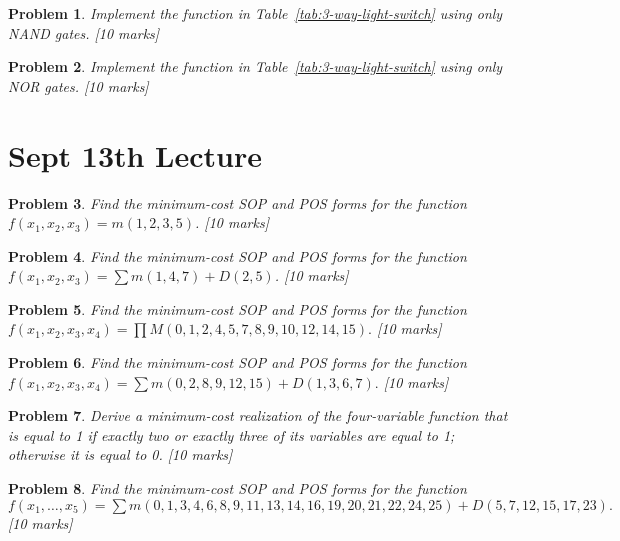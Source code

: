 \documentclass[twocolumn]{article}
\newtheorem{prob}{Problem}
\begin{document}
\begin{prob}
 Implement the function in Table~\ref{tab:3-way-light-switch} using only NAND
 gates. [10 marks]
\end{prob}

\begin{prob}
 Implement the function in Table~\ref{tab:3-way-light-switch} using only NOR
 gates. [10 marks]
\end{prob}

\section{Sept 13th Lecture}

\begin{prob}
Find the minimum-cost SOP and POS forms for the function $f(x_1 , x_2 , x_3 ) =
m(1, 2, 3, 5)$. \cite[Prob 2.37]{brown2013fundamentals} [10 marks]
\label{prob:237}
\end{prob}

\begin{prob}
Find the minimum-cost SOP and POS forms for the function $f(x_1 , x_2 , x_3) =
\sum m(1, 4, 7) + D(2, 5)$. \cite[Prob 2.38]{brown2013fundamentals} [10 marks]
\end{prob}

\begin{prob}
Find the minimum-cost SOP and POS forms for the function $f(x_1 , x_2 , x_3,
x_4) = \prod M(0, 1, 2, 4, 5, 7, 8, 9, 10, 12, 14, 15).$ \cite[Prob
2.39]{brown2013fundamentals} [10 marks]
\end{prob}

\begin{prob}
Find the minimum-cost SOP and POS forms for the function $f(x_1 , x_2 , x_3, x_4) =
\sum m(0, 2, 8, 9, 12, 15) + D(1, 3, 6, 7).$ \cite[Prob
2.40]{brown2013fundamentals} [10 marks]
\end{prob}

\begin{prob}
Derive a minimum-cost realization of the four-variable function that is equal to 1 if exactly
two or exactly three of its variables are equal to 1; otherwise it is equal to
0. \cite[Prob 2.46]{brown2013fundamentals} [10 marks]
\end{prob}

\begin{prob}
  Find the minimum-cost SOP and POS forms for the function $f(x_1 , \dots, x_5) =
  \sum m(0, 1, 3, 4, 6, 8, 9, 11, 13, 14, 16, 19, 20, 21, 22, 24, 25) + D(5, 7,
  12, 15, 17, 23).$  \cite[Prob 2.42]{brown2013fundamentals} [10 marks]
\end{prob}



\end{document}
